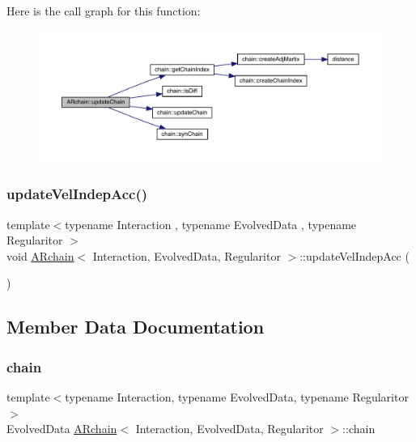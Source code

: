 Here is the call graph for this function\+:
\nopagebreak
\begin{figure}[H]
\begin{center}
\leavevmode
\includegraphics[width=350pt]{class_a_rchain_ad576df000b6d9f3948eae2793c6b3c54_cgraph}
\end{center}
\end{figure}
\mbox{\label{class_a_rchain_a08ddf32fb537ac1556b2e4560abf3b5d}} 
\subsubsection{\texorpdfstring{update\+Vel\+Indep\+Acc()}{updateVelIndepAcc()}}
{\footnotesize\ttfamily template$<$typename Interaction , typename Evolved\+Data , typename Regularitor $>$ \\
void \mbox{\hyperlink{class_a_rchain}{A\+Rchain}}$<$ Interaction, Evolved\+Data, Regularitor $>$\+::update\+Vel\+Indep\+Acc (\begin{DoxyParamCaption}{ }\end{DoxyParamCaption})\hspace{0.3cm}{\ttfamily [private]}}



\subsection{Member Data Documentation}
\mbox{\label{class_a_rchain_af7780024bfc1beca5f5622086b909db2}} 
\subsubsection{\texorpdfstring{chain}{chain}}
{\footnotesize\ttfamily template$<$typename Interaction, typename Evolved\+Data, typename Regularitor$>$ \\
Evolved\+Data \mbox{\hyperlink{class_a_rchain}{A\+Rchain}}$<$ Interaction, Evolved\+Data, Regularitor $>$\+::chain\hspace{0.3cm}{\ttfamily [private]}}

